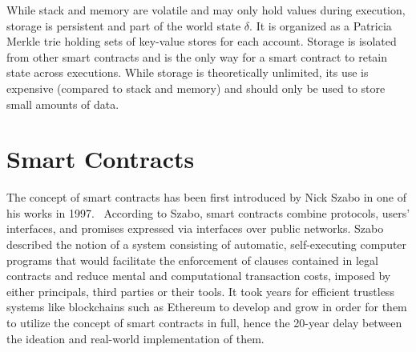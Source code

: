         While stack and memory are volatile and may only hold values during execution, storage is persistent and part of the world state $\delta$.
        It is organized as a Patricia Merkle trie holding sets of key-value stores for each account.
        Storage is isolated from other smart contracts and is the only way for a smart contract to retain state across executions.
        While storage is theoretically unlimited, its use is expensive (compared to stack and memory) and should only be used to store small amounts of data.

\section{Smart Contracts}
    The concept of smart contracts has been first introduced by Nick Szabo in one of his works in 1997.~\cite{szabo1997formalizing}
    According to Szabo, smart contracts combine protocols, users' interfaces, and promises expressed via interfaces over public networks.
    Szabo described the notion of a system consisting of automatic, self-executing computer programs that would facilitate the enforcement of clauses contained in legal contracts and reduce mental and computational transaction costs, imposed by either
    principals, third parties or their tools.
    It took years for efficient trustless systems like blockchains such as Ethereum to develop and grow in order for them to utilize the concept of smart contracts in full, hence the 20-year delay between the ideation and real-world implementation of them.

